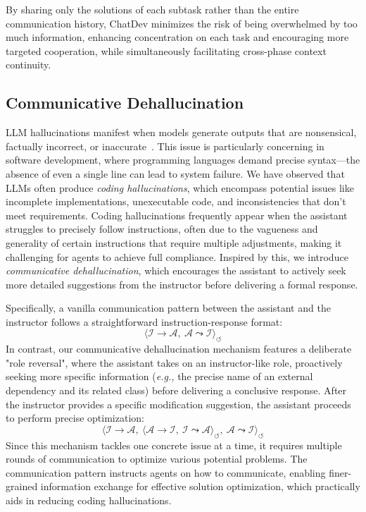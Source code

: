 \documentclass[11pt]{article}
\newcommand{\eg}{\textit{e.g., }}
\begin{document}
By sharing only the solutions of each subtask rather than the entire communication history, ChatDev minimizes the risk of being overwhelmed by too much information, enhancing concentration on each task and encouraging more targeted cooperation, while simultaneously facilitating cross-phase context continuity.


\subsection{Communicative Dehallucination}
LLM hallucinations manifest when models generate outputs that are nonsensical, factually incorrect, or inaccurate~\cite{dhuliawala2023chain,zhang2023siren}. This issue is particularly concerning in software development, where programming languages demand precise syntax—the absence of even a single line can lead to system failure.
We have observed that LLMs often produce \textit{coding hallucinations}, which encompass potential issues like incomplete implementations, unexecutable code, and inconsistencies that don't meet requirements.
Coding hallucinations frequently appear when the assistant struggles to precisely follow instructions, often due to the vagueness and generality of certain instructions that require multiple adjustments, making it challenging for agents to achieve full compliance.
Inspired by this, we introduce \textit{communicative dehallucination}, which encourages the assistant to actively seek more detailed suggestions from the instructor before delivering a formal response.

Specifically, a vanilla communication pattern between the assistant and the instructor follows a straightforward instruction-response format:
\begin{equation}
\langle \mathcal{I}\rightarrow\mathcal{A}, \ \mathcal{A}\leadsto\mathcal{I} \rangle_{\circlearrowleft}
\end{equation}
In contrast, our communicative dehallucination mechanism features a deliberate "role reversal", where the assistant takes on an instructor-like role, proactively seeking more specific information (\eg the precise name of an external dependency and its related class) before delivering a conclusive response. After the instructor provides a specific modification suggestion, the assistant proceeds to perform precise optimization:
\begin{equation}
\langle \mathcal{I}\rightarrow\mathcal{A},\  \langle\mathcal{A}\rightarrow\mathcal{I},\ \mathcal{I}\leadsto\mathcal{A}\rangle_\circlearrowleft,\  \mathcal{A}\leadsto\mathcal{I} \rangle_\circlearrowleft
\end{equation}
Since this mechanism tackles one concrete issue at a time, it requires multiple rounds of communication to optimize various potential problems.
The communication pattern instructs agents on how to communicate, enabling finer-grained information exchange for effective solution optimization, which practically aids in reducing coding hallucinations.
\end{document}
